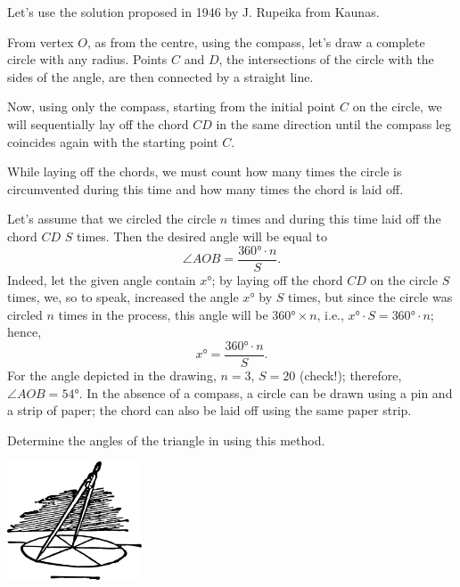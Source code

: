 Let's use the solution proposed in 1946 by J. Rupeika from Kaunas.

From vertex $O$, as from the centre, using the compass, let's draw a complete circle with any radius. Points $C$ and $D$, the intersections of the circle with the sides of the angle, are then connected by a straight line.

Now, using only the compass, starting from the initial point $C$ on the circle, we will sequentially lay off the chord $CD$ in the same direction until the compass leg coincides again with the starting point $C$.

While laying off the chords, we must count how many times the circle is circumvented during this time and how many times the chord is laid off.

Let's assume that we circled the circle $n$ times and during this time laid off the chord $CD$ $S$ times. Then the desired angle will be equal to 
\begin{equation*}%
\angle AOB = \frac{\ang{360}\cdot n}{S}.
\end{equation*}
Indeed, let the given angle contain $x \si{\degree}$; by laying off the chord $CD$ on the circle $S$ times, we, so to speak, increased the angle $x \si{\degree}$ by $S$ times, but since the circle was circled $n$ times in the process, this angle will be $\ang{360} \times n$, i.e., $x \si{\degree} \cdot S = \ang{360} \cdot n$; hence, 
\begin{equation*}%
x \si{\degree} = \frac{360° \cdot n}{S}.
\end{equation*}
For the angle depicted in the drawing, $n = 3$, $S = 20$ (check!); therefore, $ \angle AOB = \ang{54}$. In the absence of a compass, a circle can be drawn using a pin and a strip of paper; the chord can also be laid off using the same paper strip.

\ques Determine the angles of the triangle in  using this method.

\begin{center}
\includegraphics[width=0.3\textwidth]{figures/ch-05/fig-ch-05-tail.pdf}
\end{center}


















